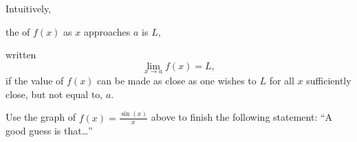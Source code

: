 \documentclass{ximera}
\begin{document}
\begin{definition}
  Intuitively,
  \begin{center}
    the  of $f(x)$ as $x$ approaches $a$ is $L$,
  \end{center}
  written
  \[
  \lim_{x\to a} f(x) = L,
  \]
  if the value of $f(x)$ can be made as close as one wishes to $L$ for
  all $x$ sufficiently close, but not equal to, $a$.
\end{definition}

\begin{question}
  Use the graph of $f(x) = \frac{\sin(x)}{x}$ above to finish the following statement: ``A good guess is that\dots''
  \begin{multipleChoice}
  \end{multipleChoice}
\end{question}
\end{document}

